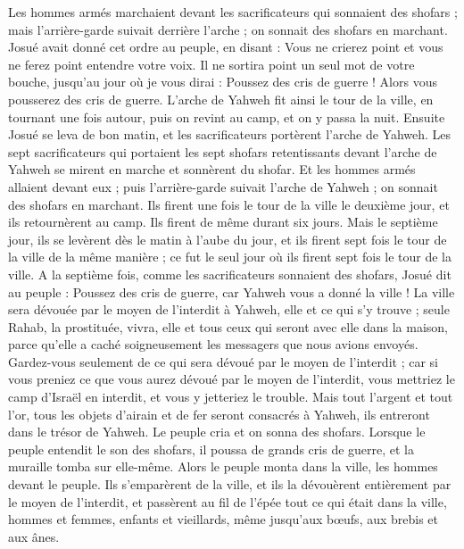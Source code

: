 \begin{multicols}{2}
Les hommes armés marchaient devant les sacrificateurs qui sonnaient des shofars ; mais l’arrière-garde suivait derrière l’arche ; on sonnait des shofars en marchant.
Josué avait donné cet ordre au peuple, en disant : Vous ne crierez point et vous ne ferez point entendre votre voix. Il ne sortira point un seul mot de votre bouche, jusqu’au jour où je vous dirai : Poussez des cris de guerre ! Alors vous pousserez des cris de guerre.
L’arche de Yahweh fit ainsi le tour de la ville, en tournant une fois autour, puis on revint au camp, et on y passa la nuit.
Ensuite Josué se leva de bon matin, et les sacrificateurs portèrent l’arche de Yahweh.
Les sept sacrificateurs qui portaient les sept shofars retentissants devant l’arche de Yahweh se mirent en marche et sonnèrent du shofar. Et les hommes armés allaient devant eux ; puis l’arrière-garde suivait l’arche de Yahweh ; on sonnait des shofars en marchant.
Ils firent une fois le tour de la ville le deuxième jour, et ils retournèrent au camp. Ils firent de même durant six jours.
Mais le septième jour, ils se levèrent dès le matin à l’aube du jour, et ils firent sept fois le tour de la ville de la même manière ; ce fut le seul jour où ils firent sept fois le tour de la ville.
A la septième fois, comme les sacrificateurs sonnaient des shofars, Josué dit au peuple : Poussez des cris de guerre, car Yahweh vous a donné la ville !
La ville sera dévouée par le moyen de l'interdit à Yahweh, elle et ce qui s’y trouve ; seule Rahab, la prostituée, vivra, elle et tous ceux qui seront avec elle dans la maison, parce qu’elle a caché soigneusement les messagers que nous avions envoyés.
Gardez-vous seulement de ce qui sera dévoué par le moyen de l'interdit ; car si vous preniez ce que vous aurez dévoué par le moyen de l'interdit, vous mettriez le camp d’Israël en interdit, et vous y jetteriez le trouble.
Mais tout l’argent et tout l’or, tous les objets d’airain et de fer seront consacrés à Yahweh, ils entreront dans le trésor de Yahweh.
Le peuple cria et on sonna des shofars. Lorsque le peuple entendit le son des shofars, il poussa de grands cris de guerre, et la muraille tomba sur elle-même. Alors le peuple monta dans la ville, les hommes devant le peuple. Ils s’emparèrent de la ville,
et ils la dévouèrent entièrement par le moyen de l'interdit, et passèrent au fil de l’épée tout ce qui était dans la ville, hommes et femmes, enfants et vieillards, même jusqu’aux bœufs, aux brebis et aux ânes.

\end{multicols}
